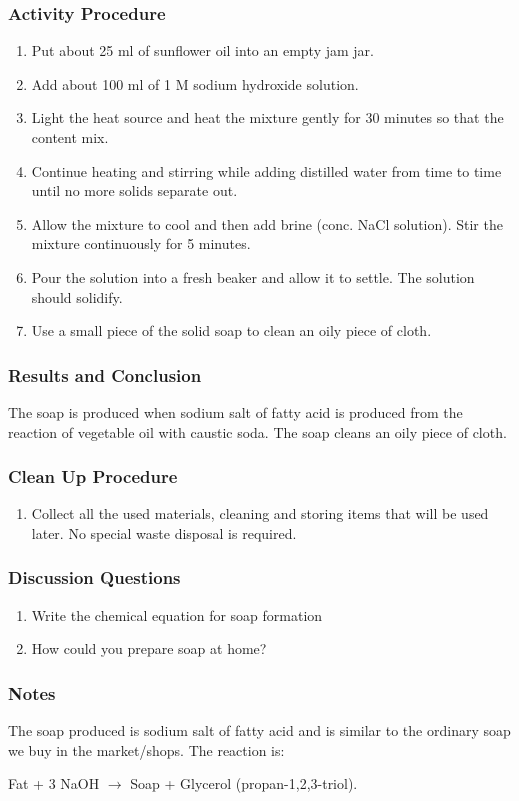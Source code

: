 \subsubsection*{Activity Procedure}
\begin{enumerate}
\item{Put about 25 ml of sunflower oil into an empty jam jar.}
\item{Add about 100 ml of 1 M sodium hydroxide solution.}
\item{Light the heat source and heat the mixture gently for 30 minutes so that the content mix.}
\item{Continue heating and stirring while adding distilled water from time to time until no more solids separate out.}
\item{Allow the mixture to cool and then add brine (conc. NaCl solution). Stir the mixture continuously for 5 minutes.}
\item{Pour the solution into a fresh beaker and allow it to settle. The solution should solidify.}
\item{Use a small piece of the solid soap to clean an oily piece of cloth.}
\end{enumerate}

\subsubsection*{Results and Conclusion}
The soap is produced when sodium salt of fatty acid is produced from the reaction of vegetable oil with caustic soda. The soap cleans an oily piece of cloth.

\subsubsection*{Clean Up Procedure}
\begin{enumerate}
\item{Collect all the used materials, cleaning and storing items that will be used later. No special waste disposal is required.}
\end{enumerate}

\subsubsection*{Discussion Questions}
\begin{enumerate}
\item{Write the chemical equation for soap formation}
\item{How could you prepare soap at home?}
\end{enumerate}

\subsubsection*{Notes}
The soap produced is sodium salt of fatty acid and is similar to the ordinary soap we buy in the market/shops.
The reaction is:

Fat  +  3 NaOH  $\longrightarrow$ Soap  +  Glycerol (propan-1,2,3-triol).

